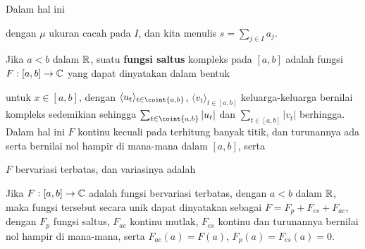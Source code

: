 

\noindent Dalam hal ini


\noindent dengan $\mu$ ukuran cacah pada $I$, dan kita menulis
$s=\sum_{j\in I}a_j$.

 Jika $a<b$ dalam $\Bbb R$, suatu {\bf fungsi
saltus} kompleks pada $[a,b]$ adalah fungsi $F:[a,b]\to\Bbb C$ yang dapat dinyatakan dalam
bentuk


\noindent untuk $x\in [a,b]$, dengan $\langle
u_t\rangle_{t\in\coint{a,b}}$,
$\langle v_t\rangle_{t\in[a,b]}$ keluarga-keluarga bernilai kompleks sedemikian sehingga
$\sum_{t\in\coint{a,b}}|u_t|$ dan
$\sum_{t\in[a,b]}|v_t|$ berhingga.   Dalam hal ini $F$
kontinu kecuali pada terhitung banyak titik, dan turunannya ada serta bernilai
nol hampir di mana-mana dalam $[a,b]$, serta



\noindent{}$F$ bervariasi terbatas, dan variasinya adalah



 Jika $F:[a,b]\to\Bbb C$ adalah fungsi bervariasi
terbatas, dengan $a<b$ dalam $\Bbb R$, maka fungsi tersebut secara unik dapat dinyatakan sebagai
$F=F_p+F_{cs}+F_{ac}$, dengan $F_p$ fungsi saltus, $F_{ac}$
kontinu mutlak, $F_{cs}$ kontinu dan turunannya bernilai nol
hampir di mana-mana, serta $F_{ac}(a)=F(a)$, $F_p(a)=F_{cs}(a)=0$.

